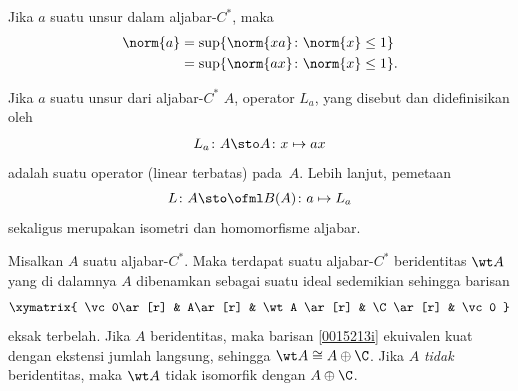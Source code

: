 \begin{prop}\label{001315} Jika $a$ suatu unsur dalam aljabar-$C^*$, maka
  \begin{align*}
    \norm{a} &= \sup\{\norm{xa}\colon \norm{x} \le 1\} \\
             &= \sup\{\norm{ax}\colon \norm{x} \le 1\}.
  \end{align*}
\end{prop}

\begin{cor}\label{0013151} Jika $a$ suatu unsur dari aljabar-$C^*$ $A$, operator $L_a$,
yang disebut
 dan didefinisikan oleh
   \[ L_a\colon A \sto A\colon x \mapsto ax \]
adalah suatu operator (linear terbatas) pada~$A$. Lebih lanjut, pemetaan
   \[ L\colon A \sto \ofml B(A)\colon a \mapsto L_a \]
sekaligus merupakan isometri dan homomorfisme aljabar.
\end{cor}

\begin{prop}\label{0015213} Misalkan $A$ suatu aljabar-$C^*$. Maka terdapat suatu
aljabar-$C^*$ beridentitas $\wt A$ yang di dalamnya $A$ dibenamkan sebagai suatu ideal
sedemikian sehingga barisan
 \begin{equation}\label{0015213i}
   \xymatrix{
     \vc 0\ar[r] & A\ar[r] & \wt A \ar[r] & \C \ar[r] & \vc 0
 }\end{equation}
eksak terbelah. Jika $A$ beridentitas, maka barisan \eqref{0015213i} ekuivalen kuat dengan
ekstensi jumlah langsung, sehingga $\wt A \cong A \oplus \C$. Jika $A$ \emph{tidak}
beridentitas, maka $\wt A$ tidak isomorfik dengan $A \oplus \C$.
\end{prop}

